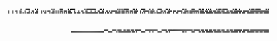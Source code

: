 \documentclass[10pt]{article}
\theoremstyle{plain}
\theoremstyle{definition}
\begin{document}
\begin{table*}[b]
{\begin{minipage}{5.32in}
\[\begin{array}{@{}r@{}}
\begin{array}{@{}l@{}}
\a\a\a\a\a\a\a\a\a\a\a\a\a\a\a\b\a\a\a\a\b\b\b\b\a\a\a\a\a\b\a\b\a\a\a\a \a\a\a\a\a\a\a\a\a\b\a\b\a\a\a\a\a\b\b\b\a\a\a\a\a\b\a\b\b\b\b\b\a\a\a\a \a\a\a\a\a\b\a\b\b\b\b\b\b\b\b\b\a\a\a\a\b\b\a\b\a\a\a\a\a\a\a\a\a\a\a\a \a\b\a\b\a\b\a\b\b\b\b\b\a\a\a\a\b\b\a\b\a\a\a\a\b\b\b\b\a\a\a\a\b\a\a\b \a\a\a\a\b\b\b\b\a\a\a\a\b\b\a\b\a\a\a\a\a\a\a\a\a\a\a\a\b\b\a\b\a\a\a\a \a\b\b\b\a\a\a\a\b\b\a\b\b\a\a\b\a\b\a\b\a\a\a\a\a\b\a\b\b\b\a\b\b\b\b\b \a\a\a\a\a\b\a\b\b\a\a\b\a\a\a\a\a\a\a\a\a\b\a\b\b\b\a\b\b\b\b\b\a\a\a\a \a\b\a\b\mynl
\a\a\a\b\a\a\a\b\a\a\b\b\a\a\b\b\a\a\a\b\a\a\a\b\a\a\b\b\a\a\b\b\a\a\a\b \a\b\a\b\a\b\b\b\a\a\b\b\a\b\a\b\a\b\b\b\a\b\b\b\a\b\b\b\a\a\a\b\a\a\a\b \a\a\b\b\a\a\b\b\a\a\a\b\a\a\a\b\a\a\b\b\a\a\b\b\a\a\b\b\a\b\a\b\b\b\b\b \b\a\b\b\a\b\b\b\a\b\b\b\a\b\b\b\a\b\b\b\b\a\a\b\a\a\b\b\b\b\b\b\a\b\b\b \b\a\a\b\a\a\a\b\b\a\b\b\a\a\b\b\b\b\a\b\b\b\a\b\b\b\b\b\a\a\b\b\b\b\a\b \b\b\b\b\b\b\b\b\a\b\b\b\b\a\b\b\b\a\b\b\b\a\b\b\b\a\b\b\b\a\b\b\b\a\a\b \b\a\b\b\b\a\b\b\b\b\b\b\b\b\a\b\b\b\b\b\b\a\b\b\b\b\b\b\b\b\b\b\b\b\b\b \b\b\b\b\mynl
\a\a\a\b\a\a\a\b\a\a\a\b\a\a\b\b\a\b\a\b\a\b\b\b\a\b\a\b\a\b\b\b\a\a\a\b \a\a\b\b\a\a\a\b\a\b\b\b\a\b\a\b\a\b\a\b\a\b\a\b\a\b\b\b\b\a\a\b\b\a\b\b \b\a\a\b\b\a\b\b\b\b\b\b\b\b\b\b\b\b\a\b\b\b\b\b\a\b\a\b\b\a\b\b\a\a\a\b \b\b\b\b\a\b\b\b\a\b\a\b\a\b\a\b\a\b\b\b\a\a\a\b\a\b\a\b\a\a\a\b\a\b\b\b \a\b\a\b\b\b\b\b\a\b\a\b\a\b\b\b\a\a\a\b\a\a\b\b\a\a\a\b\a\b\b\b\a\b\a\b \b\b\a\b\a\b\a\b\a\b\b\b\b\b\a\b\b\b\b\b\b\b\a\b\b\b\b\b\b\b\a\b\b\b\b\b \b\b\a\b\b\b\b\b\b\b\a\b\b\a\b\b\b\a\a\b\b\b\b\b\b\b\a\b\b\b\a\b\b\b\a\b \b\b\b\b
\end{array}
\mynnl
\begin{array}{@{}l@{}}
\a\a\a\a\a\a\a\a\a\a\a\a\a\a\a\a\a\a\a\a\a\a\a\a\a\a\a\a\a\a\a\a\a\a\a\a \a\a\a\a\a\a\a\a\a\a\a\a\a\a\a\a\a\a\a\a\a\a\a\a\a\a\a\a\a\a\a\a\a\a\a\a \a\a\a\a\a\a\a\a\a\a\a\a\a\a\a\a\a\a\a\a\a\a\a\a\b\b\b\b\a\a\a\a\b\b\b\b \a\b\b\b\b\a\a\b\b\a\b\b\b\a\b\b\b\a\b\b\b\b\b\b\a\a\a\a\b\b\b\b\b\b\b\b \b\b\b\b\a\a\a\a\b\b\b\b\b\a\b\b\b\b\b\b\b\b\b\b\b\b\b\b\b\b\b\b\b\b\b\b \b\b\a\b\b\b\b\b\b\a\b\b\b\a\b\b\b\a\b\b\b\a\b\b\b\a\b\b\b\a\b\b\b\a\a\b \b\a\b\b\b\a\b\b\b\b\b\b\b\b\a\b\b\b\b\b\b\a\b\b\b\b\b\b\b\b\b\b\b\b\b\b \b\b\b\b\mynl
\a\a\a\a\a\a\a\a\a\a\a\a\a\a\a\a\a\a\a\a\a\a\a\a\a\a\a\a\a\a\a\a\a\a\a\a \a\a\a\a\a\a\a\a\a\a\a\a\a\a\a\a\a\a\a\a\a\a\a\a\a\a\a\a\b\b\b\b\b\b\b\b \b\b\b\b\b\b\b\b\b\b\b\b\b\b\b\b\b\b\b\b\b\b\b\b\a\a\a\a\b\b\b\b\a\a\a\a \b\a\b\b\b\b\b\b\b\b\b\b\b\b\a\b\b\b\a\b\a\a\a\a\b\b\b\b\a\a\a\a\b\a\a\b \a\a\a\a\b\b\b\b\a\a\a\a\b\b\a\b\a\a\a\a\a\a\a\a\a\a\a\a\b\b\a\b\a\a\a\a \a\b\b\b\a\a\a\a\b\b\a\b\b\b\a\b\b\b\b\b\b\b\a\b\b\b\b\b\b\b\a\b\b\b\b\b \b\b\a\b\b\b\b\b\b\b\a\b\b\a\b\b\b\a\a\b\b\b\b\b\b\b\a\b\b\b\a\b\b\b\a\b \b\b\b\b\mynl

\end{array}
\end{array}\]
\end{minipage}}
\end{table*}
\end{document}
